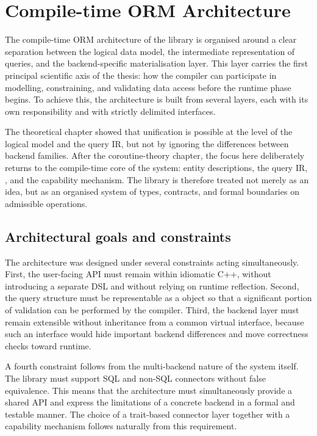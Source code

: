 \section{Compile-time ORM Architecture}
\label{sec:architecture}

The compile-time ORM architecture of the library is organised around a clear separation between the logical data model, the intermediate representation of queries, and the backend-specific materialisation layer. This layer carries the first principal scientific axis of the thesis: how the compiler can participate in modelling, constraining, and validating data access before the runtime phase begins. To achieve this, the architecture is built from several layers, each with its own responsibility and with strictly delimited interfaces.

The theoretical chapter showed that unification is possible at the level of the logical model and the query IR, but not by ignoring the differences between backend families. After the coroutine-theory chapter, the focus here deliberately returns to the compile-time core of the system: entity descriptions, the query IR, , and the capability mechanism. The library is therefore treated not merely as an idea, but as an organised system of types, contracts, and formal boundaries on admissible operations.

\subsection{Architectural goals and constraints}

The architecture was designed under several constraints acting simultaneously. First, the user-facing API must remain within idiomatic C++, without introducing a separate DSL and without relying on runtime reflection. Second, the query structure must be representable as a  object so that a significant portion of validation can be performed by the compiler. Third, the backend layer must remain extensible without inheritance from a common virtual interface, because such an interface would hide important backend differences and move correctness checks toward runtime.

A fourth constraint follows from the multi-backend nature of the system itself. The library must support SQL and non-SQL connectors without false equivalence. This means that the architecture must simultaneously provide a shared API and express the limitations of a concrete backend in a formal and testable manner. The choice of a trait-based connector layer together with a capability mechanism follows naturally from this requirement.


